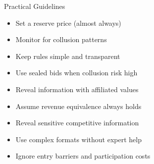 \documentclass[xcolor={x11names}, aspectratio=169 ]{beamer}
\begin{document}
\begin{frame}{Practical Guidelines}
\begin{tcolorbox}[colback=green!5,colframe=green!40!black,title=DO]
\begin{itemize}
  \item Set a reserve price (almost always)
  \item Monitor for collusion patterns
  \item Keep rules simple and transparent
  \item Use sealed bids when collusion risk high
  \item Reveal information with affiliated values
\end{itemize}
\end{tcolorbox}

\begin{tcolorbox}[colback=red!5,colframe=red!40!black,title=DON'T]
\begin{itemize}
  \item Assume revenue equivalence always holds
  \item Reveal sensitive competitive information
  \item Use complex formats without expert help
  \item Ignore entry barriers and participation costs
\end{itemize}
\end{tcolorbox}
\end{frame}
\end{document}
